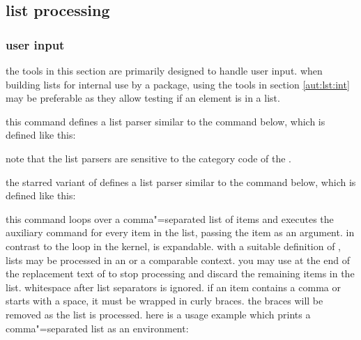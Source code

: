 \subsection{list processing}
\label{aut:lst}

\subsubsection{user input}
\label{aut:lst:inp}

the tools in this section are primarily designed to handle user input. when building lists for internal use by a package, using the tools in section \ref{aut:lst:int} may be preferable as they allow testing if an element is in a list.

\begin{ltxsyntax}


this command defines a list parser similar to the  command below, which is defined like this:

\begin{ltxcode}
\declarelistparser{\docsvlist}{,}
\end{ltxcode}
%
note that the list parsers are sensitive to the category code of the .


the starred variant of  defines a list parser similar to the  command below, which is defined like this:

\begin{ltxcode}
\declarelistparser*{\forcsvlist}{,}
\end{ltxcode}


this command loops over a comma"=separated list of items and executes the auxiliary command  for every item in the list, passing the item as an argument. in contrast to the  loop in the \latex kernel,  is expandable. with a suitable definition of , lists may be processed in an  or a comparable context. you may use  at the end of the replacement text of  to stop processing and discard the remaining items in the list. whitespace after list separators is ignored. if an item contains a comma or starts with a space, it must be wrapped in curly braces. the braces will be removed as the list is processed. here is a usage example which prints a comma"=separated list as an  environment:


\end{ltxsyntax}
